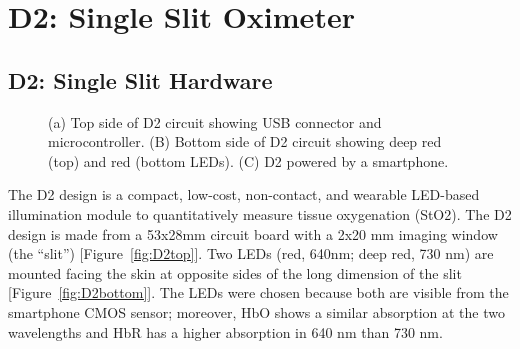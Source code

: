 \section{D2: Single Slit Oximeter}
    \subsection{D2: Single Slit Hardware}
    \begin{figure}
        \begin{center}
        \end{center}
        \caption{(a) Top side of D2 circuit showing USB connector and microcontroller. (B) Bottom side of D2 circuit showing deep red (top) and red (bottom LEDs). (C) D2 powered by a smartphone.} 
        \label{fig:D2hardware}
    \end{figure} 
    The D2 design is a compact, low-cost, non-contact, and wearable LED-based illumination module to quantitatively measure tissue oxygenation (StO2). The D2 design is made from a 53x28mm circuit board with a 2x20 mm imaging window (the “slit”) [Figure~\ref{fig:D2top}]. Two LEDs (red, 640nm; deep red, 730 nm) are mounted facing the skin at opposite sides of the long dimension of the slit [Figure~\ref{fig:D2bottom}]. The LEDs were chosen because both are visible from the smartphone CMOS sensor; moreover, HbO shows a similar absorption at the two wavelengths and HbR has a higher absorption in 640 nm than 730 nm. 
    
